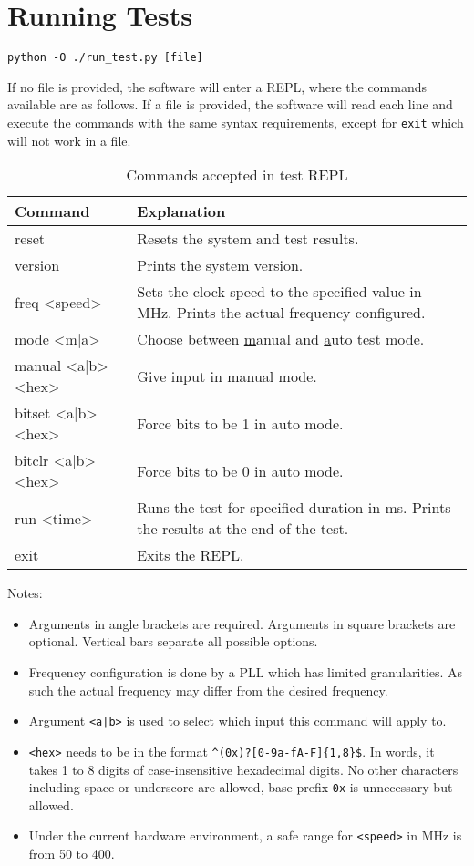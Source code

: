 \section{Running Tests}

\texttt{python -O ./run\_test.py [file]}

If no file is provided, the software will enter a REPL, where the commands available are as follows.
If a file is provided, the software will read each line and execute the commands with the same syntax requirements, except for \texttt{exit} which will not work in a file.

\begin{table}[H]
  \centering
  \begin{tabular}{|>{\ttfamily}p{11em}|p{\dimexpr\textwidth-18em}|}
    \hline
    \textrm{Command}   & Explanation \\
    \hline
    reset              & Resets the system and test results. \\
    version            & Prints the system version. \\
    freq <speed>       & Sets the clock speed to the specified value in MHz. Prints the actual frequency configured. \\
    mode <m|a>         & Choose between \underline{m}anual and \underline{a}uto test mode. \\
    manual <a|b> <hex>  & Give input in manual mode. \\
    bitset <a|b> <hex>  & Force bits to be 1 in auto mode. \\
    bitclr <a|b> <hex>  & Force bits to be 0 in auto mode. \\
    run <time>         & Runs the test for specified duration in ms. Prints the results at the end of the test. \\
    exit               & Exits the REPL. \\
    \hline
  \end{tabular}
  \caption{Commands accepted in test REPL}
\end{table}

Notes:
\begin{itemize}
  \item Arguments in angle brackets are required.
        Arguments in square brackets are optional.
        Vertical bars separate all possible options.
  \item Frequency configuration is done by a PLL which has limited granularities.
        As such the actual frequency may differ from the desired frequency.
  \item Argument \texttt{<a|b>} is used to select which input this command will apply to.
  \item \texttt{<hex>} needs to be in the format \texttt{\textasciicircum(0x)?[0-9a-fA-F]\{1,8\}\$}.
        In words, it takes 1 to 8 digits of case-insensitive hexadecimal digits.
        No other characters including space or underscore are allowed, base prefix \texttt{0x} is unnecessary but allowed.
  \item Under the current hardware environment, a safe range for \texttt{<speed>} in MHz is from 50 to 400.
\end{itemize}
